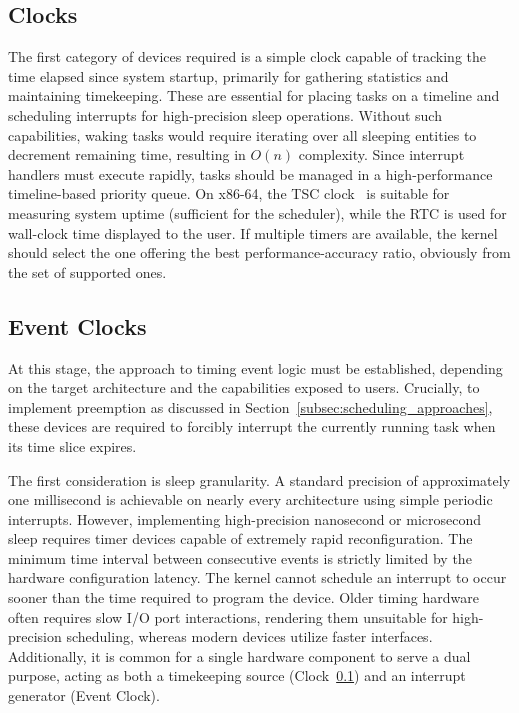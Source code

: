 \documentclass[a4paper,10pt,twoside]{report}
\theoremstyle{definition}
\begin{document}
\subsection{Clocks}
\label{subsec:clocks-tutorial}

The first category of devices required is a simple clock capable of tracking the time elapsed since system startup, primarily for gathering statistics and maintaining timekeeping. These are essential for placing tasks on a timeline and scheduling interrupts for high-precision sleep operations. Without such capabilities, waking tasks would require iterating over all sleeping entities to decrement remaining time, resulting in $O(n)$ complexity. Since interrupt handlers must execute rapidly, tasks should be managed in a high-performance timeline-based priority queue. On x86-64, the TSC clock~\cite{IntelManual-TSC} is suitable for measuring system uptime (sufficient for the scheduler), while the RTC is used for wall-clock time displayed to the user. If multiple timers are available, the kernel should select the one offering the best performance-accuracy ratio, obviously from the set of supported ones.

\subsection{Event Clocks}
\label{subsec:event_clocks}

At this stage, the approach to timing event logic must be established, depending on the target architecture and the capabilities exposed to users. Crucially, to implement preemption as discussed in Section~\ref{subsec:scheduling_approaches}, these devices are required to forcibly interrupt the currently running task when its time slice expires.

The first consideration is sleep granularity. A standard precision of approximately one millisecond is achievable on nearly every architecture using simple periodic interrupts. However, implementing high-precision nanosecond or microsecond sleep requires timer devices capable of extremely rapid reconfiguration. The minimum time interval between consecutive events is strictly limited by the hardware configuration latency. The kernel cannot schedule an interrupt to occur sooner than the time required to program the device. Older timing hardware often requires slow I/O port interactions, rendering them unsuitable for high-precision scheduling, whereas modern devices utilize faster interfaces. Additionally, it is common for a single hardware component to serve a dual purpose, acting as both a timekeeping source (Clock~\ref{subsec:clocks-tutorial}) and an interrupt generator (Event Clock).
\end{document}
